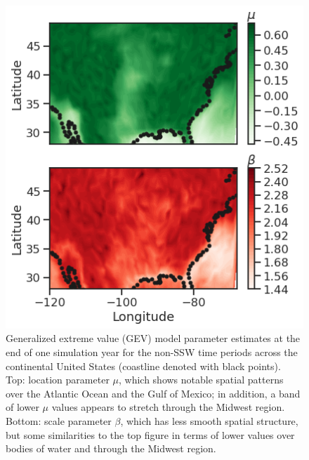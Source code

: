 \documentclass{juliacon}
\begin{document}
\begin{figure}
    \centering
    \includegraphics[width=0.8\linewidth]{figures/ssw_results.png}
    \caption{Generalized extreme value (GEV) model parameter estimates at the end of one simulation year for the non-SSW time periods across the continental United States (coastline denoted with black points). Top: location parameter $\mu$, which shows notable spatial patterns over the Atlantic Ocean and the Gulf of Mexico; in addition, a band of lower $\mu$ values appears to stretch through the Midwest region. Bottom: scale parameter $\beta$, which has less smooth spatial structure, but some similarities to the top figure in terms of lower values over bodies of water and through the Midwest region.}
    \label{fig:ssw_results}
\end{figure}
\end{document}
